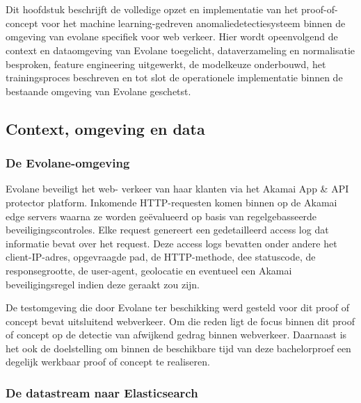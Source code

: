 \chapter{} 
\label{ch:proof-of-concept}

Dit hoofdstuk beschrijft de volledige opzet en implementatie van het proof-of-concept voor het machine learning-gedreven anomaliedetectiesysteem binnen de omgeving van evolane specifiek voor web verkeer. 
Hier wordt opeenvolgend de context en dataomgeving van Evolane toegelicht, dataverzameling en normalisatie besproken, feature engineering uitgewerkt, de modelkeuze onderbouwd, het trainingsproces beschreven en tot slot de operationele implementatie binnen de bestaande omgeving van Evolane geschetst.

\section{Context, omgeving en data}
\label{sec:context-omgeving-data}


\subsection{De Evolane-omgeving}
\label{subsec:evolane-omgeving}

Evolane beveiligt het web- verkeer van haar klanten via het Akamai App & API protector platform. Inkomende HTTP-requesten komen binnen op de Akamai edge servers waarna ze worden geëvalueerd op basis van regelgebasseerde beveiligingscontroles. Elke request genereert een gedetailleerd access log dat informatie bevat over het request. Deze access logs bevatten onder andere het client-IP-adres, opgevraagde pad, de HTTP-methode, dee statuscode, de responsegrootte, de user-agent, geolocatie en eventueel een Akamai beveiligingsregel indien deze geraakt zou zijn. 

De testomgeving die door Evolane ter beschikking werd gesteld voor dit proof of concept bevat uitsluitend webverkeer. Om die reden ligt de focus binnen dit proof of concept op de detectie van afwijkend gedrag binnen webverkeer. Daarnaast is het ook de doelstelling om binnen de beschikbare tijd van deze bachelorproef een degelijk werkbaar proof of concept te realiseren.
\subsection{De datastream naar Elasticsearch}
\label{subsec:datastream-elasticsearch}

